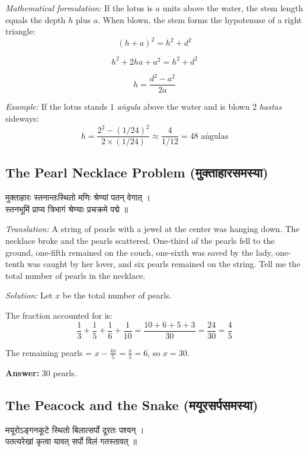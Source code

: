 \documentclass[10pt,a4paper]{article}
\newenvironment{sanskritverse}{%
  \begin{center}%
  \begin{minipage}{0.94\textwidth}%
  \centering\devanagarifont\small%
}{%
  \end{minipage}%
  \end{center}%
  \vspace{0.1em}%
}
\begin{document}
\textit{Mathematical formulation:} If the lotus is $a$ units above the water, the stem length equals the depth $h$ plus $a$. When blown, the stem forms the hypotenuse of a right triangle:
\[
(h + a)^2 = h^2 + d^2
\]

\[
h^2 + 2ha + a^2 = h^2 + d^2
\]

\[
h = \frac{d^2 - a^2}{2a}
\]

\textit{Example:} If the lotus stands 1 \textit{aṅgula} above the water and is blown 2 \textit{hastas} sideways:
\[
h = \frac{2^2 - (1/24)^2}{2 \times (1/24)} \approx \frac{4}{1/12} = 48 \text{ aṅgulas}
\]

\subsection*{The Pearl Necklace Problem (मुक्ताहारसमस्या)}

\begin{sanskritverse}
मुक्ताहारः स्तनान्तःस्थितो मणिः श्रेण्यां पतन् वेगात् ।\\
स्तनभूमिं प्राप्य त्रिभागं श्रेण्याः प्रचक्रमे पद्मे ॥
\end{sanskritverse}

\textit{Translation:} A string of pearls with a jewel at the center was hanging down. The necklace broke and the pearls scattered. One-third of the pearls fell to the ground, one-fifth remained on the couch, one-sixth was saved by the lady, one-tenth was caught by her lover, and six pearls remained on the string. Tell me the total number of pearls in the necklace.

\textit{Solution:} Let $x$ be the total number of pearls.

The fraction accounted for is:
\[
\frac{1}{3} + \frac{1}{5} + \frac{1}{6} + \frac{1}{10} = \frac{10 + 6 + 5 + 3}{30} = \frac{24}{30} = \frac{4}{5}
\]

The remaining pearls = $x - \frac{4x}{5} = \frac{x}{5} = 6$, so $x = 30$.

\textbf{Answer:} 30 pearls.

\subsection*{The Peacock and the Snake (मयूरसर्पसमस्या)}

\begin{sanskritverse}
मयूरोऽङ्गनकूटे स्थितो बिलात्सर्पो दूरतः पश्यन् ।\\
पतत्यरेखां कृत्वा यावत् सर्पो विलं गतस्तावत् ॥
\end{sanskritverse}
\end{document}

